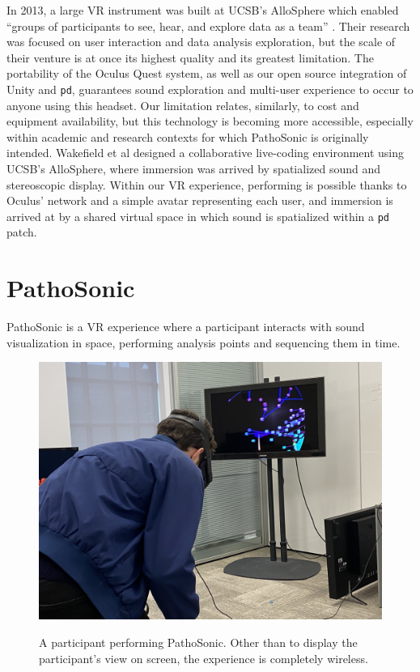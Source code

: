 \documentclass{nime-alternate}
\begin{document}
In 2013, a large VR instrument was built at UCSB's AlloSphere which enabled ``groups of participants to see, hear, and explore data as a team'' \cite{KUCHERAMORIN201410}. Their research was focused on user interaction and data analysis exploration, but the scale of their venture is at once its highest quality and its greatest limitation. The portability of the Oculus Quest system, as well as our open source integration of Unity and \texttt{pd}, guarantees sound exploration and multi-user experience to occur to anyone using this headset. Our limitation relates, similarly, to cost and equipment availability, but this technology is becoming more accessible, especially within academic and research contexts for which PathoSonic is originally intended. Wakefield et al \cite{gwakefield2014} designed a collaborative live-coding environment using UCSB's AlloSphere, where immersion was arrived by spatialized sound and stereoscopic display. Within our VR experience, performing is possible thanks to Oculus' network and a simple avatar representing each user, and immersion is arrived at by a shared virtual space in which sound is spatialized within a \texttt{pd} patch. 

\section{PathoSonic}

PathoSonic is a VR experience where a participant interacts with sound visualization in space, performing analysis points and sequencing them in time.

\begin{figure}[htbp]
       \centering
              \includegraphics[width=1\textwidth]{IMG_4563.jpg}
       \label{A participant performing PathoSonic. Other than to display the participant's view on screen, the experience is completely wireless.}
       \caption{A participant performing PathoSonic. Other than to display the participant's view on screen, the experience is completely wireless.}
\end{figure}
\end{document}
